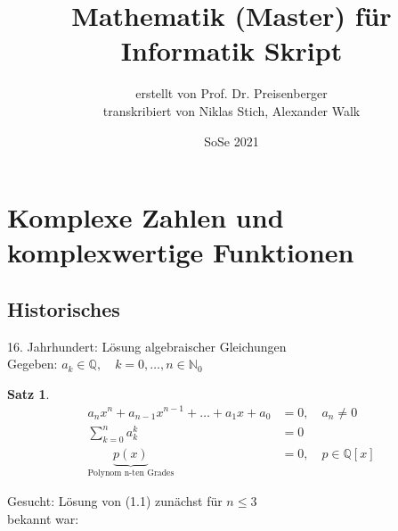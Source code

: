 \documentclass{article}
\title{Mathematik (Master) für Informatik Skript}
\date{SoSe 2021}
\author{erstellt von Prof. Dr. Preisenberger\\ transkribiert von Niklas Stich, Alexander Walk}
\theoremstyle{definition}
\newtheorem{theorem}{Satz}[section]
\theoremstyle{definition}
\begin{document}
\begin{titlepage}
\maketitle
\tableofcontents
\end{titlepage}


\section{Komplexe Zahlen und komplexwertige Funktionen}
\subsection{Historisches}
16. Jahrhundert: Lösung algebraischer Gleichungen\\
Gegeben: \(a_{k}\in\mathbb{Q},\quad k=0,\dots,n\in\mathbb{N}_{0}\)
\begin{theorem}
\begin{align}
    a_{n}x^{n}+a_{n-1}x^{n-1}+\dots+a_{1}x+a_{0} &= 0, \quad a_{n}\neq 0 \\
    \sum_{k=0}^{n}a_{k}^{k} &= 0 \\
    \underbrace{p(x)}_\text{Polynom n-ten Grades}&=0, \quad p \in \mathbb{Q}[x]
\end{align}
\end{theorem}
Gesucht: Lösung von (1.1) zunächst für $n \leq 3$\\
bekannt war:
\end{document}
